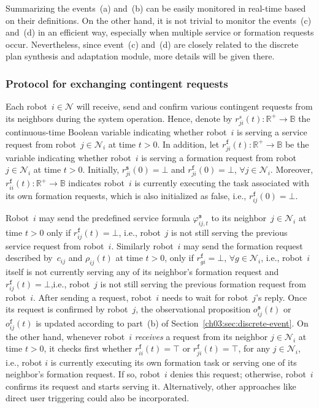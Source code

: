 Summarizing the events~(a) and~(b) can be easily monitored in real-time based on their definitions. On the other hand, it is not trivial to monitor the events~(c) and~(d) in an efficient way, especially when multiple service or formation requests occur. Nevertheless, since event~(c) and~(d) are closely related to the discrete plan synthesis and adaptation module, more details will be given there.

\subsubsection{Protocol for exchanging contingent requests}\label{ch03:subsec:communication}
Each robot~$i\in \mathcal{N}$ will receive, send and confirm various contingent requests from its neighbors during the system operation.
Hence, denote by $r^s_{ji}(t):\mathbb{R}^+\rightarrow \mathbb{B}$ the continuous-time Boolean variable indicating whether robot~$i$ is serving a service request from robot~$j\in\mathcal{N}_i$ at time $t>0$.
In addition, let $r^{\texttt{f}}_{ji}(t): \mathbb{R}^+\rightarrow \mathbb{B}$ be the variable indicating whether robot~$i$ is serving a formation request from robot~$j\in\mathcal{N}_i$ at time $t>0$. Initially, $r^{\texttt{s}}_{ji}(0)=\bot$ and $r^{\texttt{f}}_{ji}(0)=\bot$, $\forall j\in \mathcal{N}_i$. Moreover, $r^\texttt{f}_{ii}(t): \mathbb{R}^+\rightarrow \mathbb{B}$ indicates robot~$i$ is currently executing the task associated with its own formation requests, which is also initialized as false, i.e., $r_{ij}^\texttt{f}(0)=\bot$.

Robot~$i$ may send the predefined service formula $\varphi_{ij,t}^\texttt{s}$ to its neighbor~$j\in \mathcal{N}_i$ at time $t>0$ only if $r^{\texttt{f}}_{ij}(t)=\bot$, i.e., robot~$j$ is not still serving the previous service request from robot~$i$.
Similarly robot~$i$ may send the formation request described by~$c_{ij}$ and $\rho_{ij}(t)$ at time $t>0$, only if $r^{\texttt{f}}_{gi}=\bot$, $\forall g\in \mathcal{N}_i$, i.e., robot~$i$ itself is not currently serving any of its neighbor's formation request and $r^{\texttt{f}}_{ij}(t)=\bot$,i.e., robot~$j$ is not still serving the previous formation request from robot~$i$.
After sending a request, robot~$i$ needs to wait for robot~$j$'s reply.
Once its request is confirmed by robot~$j$, the observational proposition $o^\texttt{s}_{ij}(t)$ or $o^\texttt{f}_{ij}(t)$ is updated according to part~(b) of Section~\ref{ch03:sec:discrete-event}.
On the other hand,  whenever robot~$i$ \emph{receives} a request from its neighbor $j\in \mathcal{N}_i$ at time $t>0$, it checks first whether $r^\texttt{f}_{ii}(t)=\top$ or $r^{\texttt{f}}_{ji}(t)=\top$, for any $j\in \mathcal{N}_i$, i.e., robot $i$ is currently executing its own formation task or serving one of its neighbor's formation request. If so, robot~$i$ denies this request; otherwise, robot~$i$ confirms its request and starts serving it.
Alternatively, other approaches like direct user triggering could also be incorporated.

